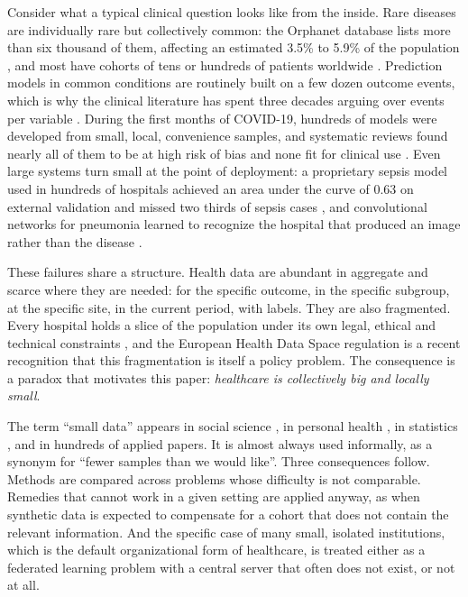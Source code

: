 \documentclass[acmsmall,screen,review]{acmart}
\theoremstyle{acmdefinition}
\begin{document}
Consider what a typical clinical question looks like from the inside. Rare diseases are individually rare but collectively common: the Orphanet database lists more than six thousand of them, affecting an estimated 3.5\% to 5.9\% of the population \cite{nguengangwakap2020estimating}, and most have cohorts of tens or hundreds of patients worldwide \cite{banerjee2023machine,schaefer2020use}. Prediction models in common conditions are routinely built on a few dozen outcome events, which is why the clinical literature has spent three decades arguing over events per variable \cite{peduzzi1996simulation,riley2019minimumsample,smeden2019sample}. During the first months of COVID-19, hundreds of models were developed from small, local, convenience samples, and systematic reviews found nearly all of them to be at high risk of bias and none fit for clinical use \cite{roberts2021common,wynants2020prediction}. Even large systems turn small at the point of deployment: a proprietary sepsis model used in hundreds of hospitals achieved an area under the curve of 0.63 on external validation and missed two thirds of sepsis cases \cite{wong2021external}, and convolutional networks for pneumonia learned to recognize the hospital that produced an image rather than the disease \cite{zech2018variable}.

These failures share a structure. Health data are abundant in aggregate and scarce where they are needed: for the specific outcome, in the specific subgroup, at the specific site, in the current period, with labels. They are also fragmented. Every hospital holds a slice of the population under its own legal, ethical and technical constraints \cite{cohen2018hipaa,gdpr2016,price2019privacy}, and the European Health Data Space regulation \cite{ehds2025} is a recent recognition that this fragmentation is itself a policy problem. The consequence is a paradox that motivates this paper: \emph{healthcare is collectively big and locally small}.

The term ``small data'' appears in social science \cite{kitchin2015small}, in personal health \cite{estrin2014small,hekler2019we}, in statistics \cite{faraway2018when}, and in hundreds of applied papers. It is almost always used informally, as a synonym for ``fewer samples than we would like''. Three consequences follow. Methods are compared across problems whose difficulty is not comparable. Remedies that cannot work in a given setting are applied anyway, as when synthetic data is expected to compensate for a cohort that does not contain the relevant information. And the specific case of many small, isolated institutions, which is the default organizational form of healthcare, is treated either as a federated learning problem with a central server that often does not exist, or not at all.
\end{document}
